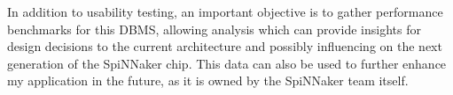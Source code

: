 In addition to usability testing, an important objective is to gather performance benchmarks for this DBMS, allowing analysis which can provide insights for design decisions to the current architecture and possibly influencing on the next generation of the SpiNNaker chip. This data can also be used to further enhance my application in the future, as it is owned by the SpiNNaker team itself.

